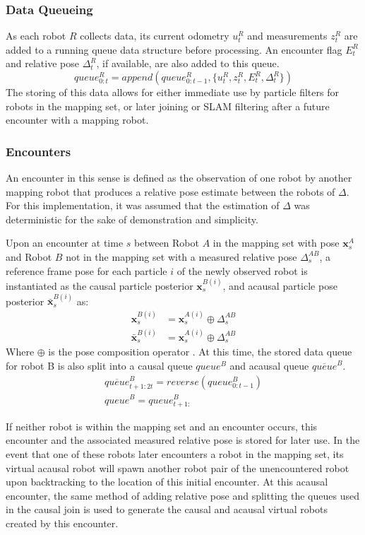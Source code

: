 \subsubsection{Data Queueing}
As each robot $R$ collects data, its current odometry $u_t^R$ and measurements $z_t^R$ are added to a running queue data structure before processing. An encounter flag $E_t^R$ and relative pose $\Delta_t^R$, if available, are also added to this queue. 
$$queue_{0:t}^R = append(queue_{0:t-1}^R, \{ u_t^R, z_t^R, E_t^R, \Delta_t^R \})$$
The storing of this data allows for either immediate use by particle filters for robots in the mapping set, or later joining or SLAM filtering after a future encounter with a mapping robot.
\vspace{0.1in}


\subsubsection{Encounters}
An encounter in this sense is defined as the observation of one robot by another mapping robot that produces a relative pose estimate between the robots of $\Delta$. For this implementation, it was assumed that the estimation of $\Delta$ was deterministic for the sake of demonstration and simplicity.

Upon an encounter at time $s$ between Robot $A$ in the mapping set with pose $\textbf{x}_s^A$ and Robot $B$ not in the mapping set with a measured relative pose $\Delta_s^{AB}$, a reference frame pose for each particle $i$ of the newly observed robot is instantiated as the causal particle posterior $\textbf{x}_s^{B(i)}$, and acausal particle pose posterior $\bar{\textbf{x}}_s^{B(i)}$ as:
\begin{align*}
\textbf{x}_s^{B(i)} &= \textbf{x}_s^{A(i)} \oplus \Delta_s^{AB} \\
\bar{\textbf{x}}_s^{B(i)} &= \textbf{x}_s^{A(i)} \oplus \Delta_s^{AB}
\end{align*}
Where $\oplus$ is the pose composition operator \cite{smithSelfCheeseman1990}.
At this time, the stored data queue for robot B is also split into a causal queue $queue^B$ and acausal queue $\overline{queue}^B$.
\begin{align*}
\overline{queue}_{t+1:2t}^B = reverse(queue_{0:t-1}^B) \\
queue^B = queue_{t+1:}^B
\end{align*}

If neither robot is within the mapping set and an encounter occurs, this encounter and the associated measured relative pose is stored for later use. In the event that one of these robots later encounters a robot in the mapping set, its virtual acausal robot will spawn another robot pair of the unencountered robot upon backtracking to the location of this initial encounter. At this acausal encounter, the same method of adding relative pose and splitting the queues used in the causal join is used to generate the causal and acausal virtual robots created by this encounter.

